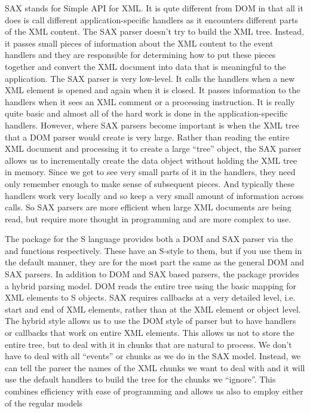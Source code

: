 SAX stands for Simple API for XML. It is qute
different from DOM in that all it does is call different
application-specific handlers as it encounters different parts of the
XML content.  The SAX parser doesn't try to build the XML tree.
Instead, it passes small pieces of information about the XML content
to the event handlers and they are responsible for determining how to put
these pieces together and convert the XML document into data that is
meaningful to the application.  The SAX parser is very low-level.  It
calls the handlers when a new XML element is opened and again when
it is closed. It passes information to the handlers when it sees an
XML comment or a processing instruction.  It is really quite basic and
almost all of the hard work is done in the application-specific handlers.  
However, where SAX parsers become important is when the XML tree 
that a DOM parser would create is very large.  
Rather than reading the entire XML document and processing it to create a 
large ``tree'' object, the SAX parser allows us to incrementally create the
data object without holding the XML tree in memory.  Since we get to
see very small parts of it in the handlers, they need only
remember enough to make sense of subsequent pieces.  And typically
these handlers work very locally and so keep a very small amount of
information across calls.  So SAX parsers are more efficient when
large XML documents are being read, but require more thought in
programming and are more complex to use.

The  package for the S language provides both a DOM and
SAX parser via the  and
 functions respectively.  These have an
S-style to them, but if you use them in the default manner, they are
for the most part the same as the general DOM and SAX parsers.
In addition to DOM and SAX based parsers, the  package
provides a hybrid parsing model.  DOM reads the entire tree using the
basic mapping for XML elements to S objects. SAX requires callbacks at
a very detailed level, i.e. start and end of XML elements, rather than
at the XML element or object level.  The hybrid style allows us to
use the DOM style of parser but to have handlers or callbacks that work
on entire XML elements.  This allows us not to store the entire tree,
but to deal with it in chunks that are natural to process.  We don't
have to deal with all ``events'' or chunks as we do in the SAX model.
Instead, we can tell the parser the names of the XML chunks we want to
deal with and it will use the default handlers to build the tree for
the chunks we ``ignore''.  This combines efficiency with ease of
programming and allows us also to employ either of the regular models


